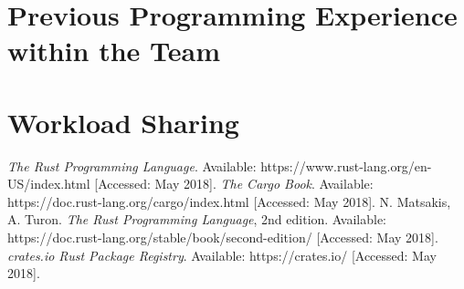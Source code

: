 \documentclass[a4paper, 11pt]{article}
\begin{document}
\section*{Previous Programming Experience within the Team}
\lipsum[7]

\section*{Workload Sharing}
\lipsum[8]

\begin{thebibliography}{9}
 \emph{The Rust Programming Language}. Available: https://www.rust-lang.org/en-US/index.html [Accessed: May 2018].
 \emph{The Cargo Book}. Available: https://doc.rust-lang.org/cargo/index.html [Accessed: May 2018].
 N. Matsakis, A. Turon. \emph{The Rust Programming Language}, 2nd edition. Available: https://doc.rust-lang.org/stable/book/second-edition/ [Accessed: May 2018].
 \emph{crates.io Rust Package Registry}. Available: https://crates.io/ [Accessed: May 2018].
\end{thebibliography}
\end{document}
